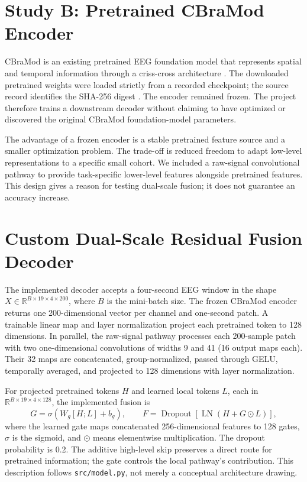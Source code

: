 \section{Study B: Pretrained CBraMod Encoder}
CBraMod is an existing pretrained EEG foundation model that represents spatial and temporal information through a criss-cross architecture \cite{wang2025cbramod}. The downloaded pretrained weights were loaded strictly from a recorded checkpoint; the source record identifies the SHA-256 digest \texttt{}. The encoder remained frozen. The project therefore trains a downstream decoder without claiming to have optimized or discovered the original CBraMod foundation-model parameters.

The advantage of a frozen encoder is a stable pretrained feature source and a smaller optimization problem. The trade-off is reduced freedom to adapt low-level representations to a specific small cohort. We included a raw-signal convolutional pathway to provide task-specific lower-level features alongside pretrained features. This design gives a reason for testing dual-scale fusion; it does not guarantee an accuracy increase.

\section{Custom Dual-Scale Residual Fusion Decoder}
The implemented decoder accepts a four-second EEG window in the shape $X\in\mathbb{R}^{B\times19\times4\times200}$, where $B$ is the mini-batch size. The frozen CBraMod encoder returns one 200-dimensional vector per channel and one-second patch. A trainable linear map and layer normalization project each pretrained token to 128 dimensions. In parallel, the raw-signal pathway processes each 200-sample patch with two one-dimensional convolutions of widths 9 and 41 (16 output maps each). Their 32 maps are concatenated, group-normalized, passed through GELU, temporally averaged, and projected to 128 dimensions with layer normalization.

For projected pretrained tokens $H$ and learned local tokens $L$, each in $\mathbb{R}^{B\times19\times4\times128}$, the implemented fusion is
\begin{equation}
G=\sigma\!\left(W_g[H;L]+b_g\right),\qquad
F=\operatorname{Dropout}\!\left[\operatorname{LN}\!\left(H+G\odot L\right)\right],
\label{eq:fusion}
\end{equation}
where the learned gate maps concatenated 256-dimensional features to 128 gates, $\sigma$ is the sigmoid, and $\odot$ means elementwise multiplication. The dropout probability is 0.2. The additive high-level skip preserves a direct route for pretrained information; the gate controls the local pathway's contribution. This description follows \texttt{src/model.py}, not merely a conceptual architecture drawing.

